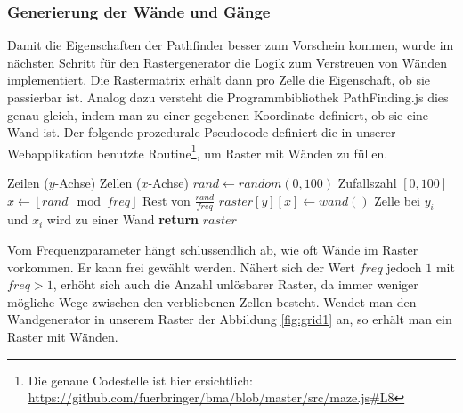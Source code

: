 \documentclass[12pt,a4paper,german]{report}
\newcommand{\floor}[1]{\left\lfloor #1 \right\rfloor}
\begin{document}
\subsubsection{Generierung der Wände und Gänge}
Damit die Eigenschaften der Pathfinder besser zum Vorschein kommen, wurde im nächsten Schritt für den Rastergenerator die Logik zum Verstreuen von Wänden implementiert. 
Die Rastermatrix erhält dann pro Zelle die Eigenschaft, ob sie passierbar ist. 
Analog dazu versteht die Programmbibliothek PathFinding.js dies genau gleich, indem man zu einer gegebenen Koordinate definiert, ob sie eine Wand ist. 
Der folgende prozedurale Pseudocode definiert die in unserer Webapplikation benutzte Routine\footnote{Die genaue Codestelle ist hier ersichtlich: \url{https://github.com/fuerbringer/bma/blob/master/src/maze.js\#L8}}, um Raster mit Wänden zu füllen.
\begin{algorithmic}[1]
   \Comment Zeilen ($y$-Achse)
     \Comment Zellen ($x$-Achse)
    \State $rand \gets random(0, 100)$ \Comment Zufallszahl $[0,100]$
    \State $x \gets \floor{rand \mod freq}$ \Comment Rest von $\frac{rand}{freq}$
      \State $raster[y][x] \gets wand()$ \Comment Zelle bei $y_i$ und $x_i$ wird zu einer Wand
    \EndIf
    \EndFor
  \EndFor
  \State \textbf{return} $raster$
  \EndProcedure
\end{algorithmic}
Vom Frequenzparameter hängt schlussendlich ab, wie oft Wände im Raster vorkommen. Er kann frei gewählt werden. Nähert sich der Wert $freq$ jedoch $1$ mit $freq > 1$, erhöht sich auch die Anzahl unlösbarer Raster, da immer weniger mögliche Wege zwischen den verbliebenen Zellen besteht.
Wendet man den Wandgenerator in unserem Raster der Abbildung \ref{fig:grid1} an, so erhält man ein Raster mit Wänden.
\end{document}
